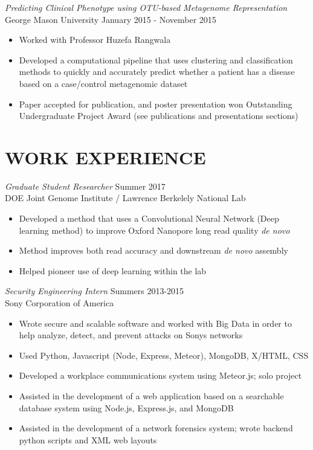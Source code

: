 \documentclass[margin, 10pt]{res} %
\begin{document}
\begin{resume}
{\sl Predicting Clinical Phenotype using OTU-based Metagenome Representation} \\
George Mason University  \hfill January 2015 - November 2015
\begin{itemize} \itemsep -2pt %
\item Worked with Professor Huzefa Rangwala
\item Developed a computational pipeline that uses clustering and classification methods to quickly and accurately predict whether a patient has a disease based on a case/control metagenomic dataset
\item Paper accepted for publication, and poster presentation won Outstanding Undergraduate Project Award (see publications and presentations sections)
\end{itemize}

 
\section{WORK EXPERIENCE}

{\sl Graduate Student Researcher} \hfill Summer 2017 \\ DOE Joint Genome Institute / Lawrence Berkelely National Lab

\begin{itemize} \itemsep -2pt %
\item Developed a method that uses a Convolutional Neural Network (Deep learning method) to improve Oxford Nanopore long read quality \emph{de novo}
\item Method improves both read accuracy and downstream \emph{de novo} assembly
\item Helped pioneer use of deep learning within the lab
\end{itemize}


{\sl Security Engineering Intern} \hfill Summers 2013-2015 \\
Sony Corporation of America 

\begin{itemize} \itemsep -2pt %
\item Wrote secure and scalable software and worked with Big Data in order to help analyze, detect, and prevent attacks on Sony\textsc{}s networks
\item Used Python, Javascript (Node, Express, Meteor), MongoDB, X/HTML, CSS 
\item Developed a workplace communications system using Meteor.js; solo project
\item Assisted in the development of a web application based on a searchable database system using Node.js, Express.js, and MongoDB
\item Assisted in the development of a network forensics system; wrote backend python scripts and XML web layouts
\end{itemize} 
 

\end{resume}
\end{document}
